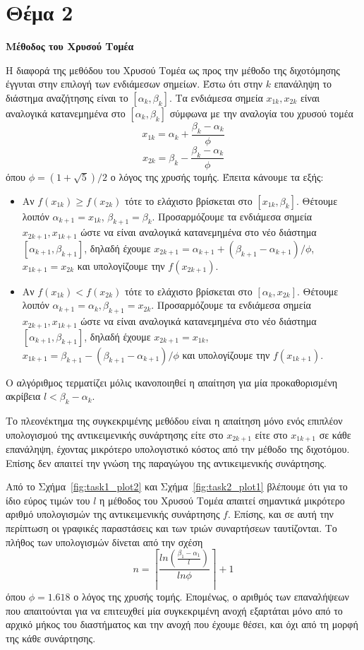 \documentclass{article}
\begin{document}
\section*{Θέμα 2}
\textbf{Μέθοδος του Χρυσού Τομέα}

Η διαφορά της μεθόδου του Χρυσού Τομέα ως προς την μέθοδο της διχοτόμησης έγγυται στην επιλογή των 
ενδιάμεσων σημείων. Έστω ότι στην $k$ επανάληψη το διάστημα αναζήτησης είναι το $[\alpha_k, \beta_k]$. 
Τα ενδιάμεσα σημεία $x_{1k}, x_{2k}$ είναι αναλογικά κατανεμημένα στο $[\alpha_k, \beta_k]$ 
σύμφωνα με την αναλογία του χρυσού τομέα
\[ x_{1k} = \alpha_k + \frac{\beta_k - \alpha_k}{\phi} \]
\[ x_{2k} = \beta_k - \frac{\beta_k - \alpha_k}{\phi} \]
όπου $\phi=(1 + \sqrt{5}) / 2$ ο λόγος της χρυσής τομής. 
Έπειτα κάνουμε τα εξής:
\begin{itemize}
    \item Αν $f(x_{1k}) \geq f(x_{2k})$ τότε το ελάχιστο βρίσκεται στο $[x_{1k}, \beta_k]$. 
    Θέτουμε λοιπόν $\alpha_{k+1} = x_{1k}$, $\beta_{k+1} = \beta_k$.
    Προσαρμόζουμε τα ενδιάμεσα σημεία $x_{2k+1}, x_{1k+1}$ ώστε να είναι αναλογικά 
    κατανεμημένα στο νέο διάστημα $[\alpha_{k+1}, \beta_{k+1}]$, δηλαδή έχουμε
    $x_{2k+1} = \alpha_{k+1} + (\beta_{k+1} - \alpha_{k+1})/\phi$,
    $x_{1k+1} = x_{2k}$
    και υπολογίζουμε την $f(x_{2k+1})$.
    \item Αν $f(x_{1k}) < f(x_{2k})$ τότε το ελάχιστο βρίσκεται στο $[\alpha_k, x_{2k}]$.
    Θέτουμε λοιπόν $\alpha_{k+1} = \alpha_k, \beta_{k+1} = x_{2k}$.
    Προσαρμόζουμε τα ενδιάμεσα σημεία $x_{2k+1}, x_{1k+1}$ ώστε να είναι αναλογικά 
    κατανεμημένα στο νέο διάστημα $[\alpha_{k+1}, \beta_{k+1}]$, δηλαδή έχουμε
    $x_{2k+1} = x_{1k}$,
    $x_{1k+1} = \beta_{k+1} - (\beta_{k+1} - \alpha_{k+1})/\phi$
    και υπολογίζουμε την $f(x_{1k+1})$.
\end{itemize}
Ο αλγόριθμος τερματίζει μόλις ικανοποιηθεί η απαίτηση για μία προκαθορισμένη ακρίβεια $l < \beta_k - \alpha_k$.

Το πλεονέκτημα της συγκεκριμένης μεθόδου είναι η απαίτηση μόνο ενός επιπλέον
υπολογισμού της αντικειμενικής συνάρτησης είτε στο $x_{2k+1}$ είτε στο $x_{1k+1}$
σε κάθε επανάληψη, έχοντας μικρότερο υπολογιστικό κόστος από την μέθοδο της διχοτόμου.
Επίσης δεν απαιτεί την γνώση της παραγώγου της αντικειμενικής συνάρτησης.

Από το Σχήμα~\ref{fig:task1_plot2} και Σχήμα~\ref{fig:task2_plot1} βλέπουμε ότι για το ίδιο
εύρος τιμών του $l$ η μέθοδος του Χρυσού Τομέα απαιτεί σημαντικά μικρότερο αριθμό υπολογισμών
της αντικειμενικής συνάρτησης $f$. Επίσης, και σε αυτή την περίπτωση οι γραφικές παραστάσεις
και των τριών συναρτήσεων ταυτίζονται. Το πλήθος των υπολογισμών δίνεται
από την σχέση
\[ n =\left\lceil \frac{ln\left(\frac{\beta_1 - \alpha_1}{l}\right)}{ln\phi} \right\rceil + 1 \]
όπου $\phi = 1.618$ ο λόγος της χρυσής τομής. Επομένως, ο αριθμός των επαναλήψεων που απαιτούνται 
για να επιτευχθεί μία συγκεκριμένη ανοχή εξαρτάται μόνο από το αρχικό μήκος του διαστήματος και την 
ανοχή που έχουμε θέσει, και όχι από τη μορφή της κάθε συνάρτησης.
\end{document}
